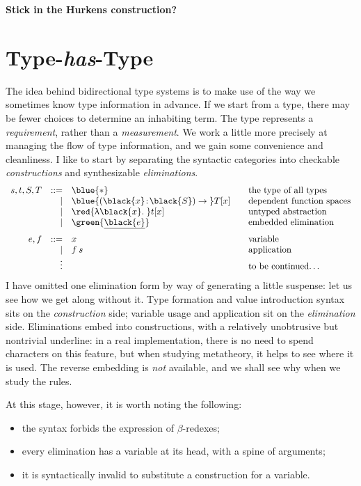 \documentclass[natbib]{article}
\newcommand{\type}{\blue{\ast}}
\newcommand{\hb}{\!:\!}
\newcommand{\PI}[2]{\blue{(\black{#1}\hb \black{#2})\to\;}}
\newcommand{\LA}[1]{\red{\uplambda\black{#1}.\;}}
\begin{document}
\textbf{Stick in the Hurkens construction?}


\section{Type-\emph{has}-Type}

\newcommand{\CHK}[3]{#1 \vdash #2 \ni #3}
\newcommand{\SYN}[3]{#1 \vdash #2 \in #3}
\newcommand{\el}[1]{\green{\underline{\black{#1}}}}

The idea behind bidirectional type systems is to make use of the way we sometimes know type information in advance. If we start from a type, there may be fewer choices to determine an inhabiting term. The type represents a \emph{requirement}, rather than a \emph{measurement}. We work a little more precisely at managing the flow of type information, and we gain some convenience and cleanliness. I like to start by separating the syntactic categories into checkable \emph{constructions} and synthesizable \emph{eliminations}.
\[\begin{array}{rrl@{\qquad}l}
s,t,S,T & ::= & \type & \mbox{the type of all types} \\
        &   | & \PI xS T[x] & \mbox{dependent function spaces} \\
        &   | & \LA x t[x] & \mbox{untyped abstraction} \\
        &   | & \el e & \mbox{embedded elimination} \medskip \\
e,f     & ::= & x     & \mbox{variable} \\
        &   | & f\:s  & \mbox{application} \\
        &   \vdots &  & \mbox{to be continued\ldots}
\end{array}\]
I have omitted one elimination form by way of generating a little suspense: let us see how we get along without it. Type formation and value introduction syntax sits on the \emph{construction} side; variable usage and application sit on the \emph{elimination} side. Eliminations embed into constructions, with a relatively unobtrusive but nontrivial underline: in a real implementation, there is no need to spend characters on this feature, but when studying metatheory, it helps to see where it is used. The reverse embedding is \emph{not} available, and we shall see why when we study the rules.

At this stage, however, it is worth noting the following:
\begin{itemize}
\item the syntax forbids the expression of $\beta$-redexes;
\item every elimination has a variable at its head, with a spine of arguments;
\item it is syntactically invalid to substitute a construction for a variable.
\end{itemize}
\end{document}

